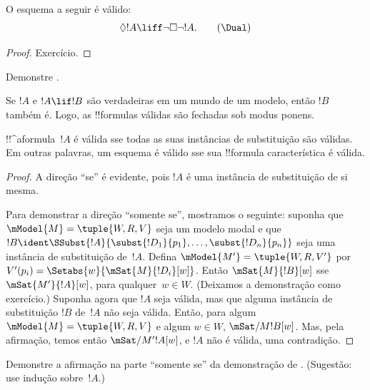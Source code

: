 \documentclass[../../../include/open-logic-section]{subfiles}
\begin{document}
\begin{prop}
  O esquema \Dual{} a seguir é válido:
  \begin{equation*}
  \Diamond !A \liff \lnot\Box\lnot !A. \tag{\Dual}
  \end{equation*}
\end{prop}

\begin{proof}
  Exercício.
\end{proof}

\begin{prob}
  Demonstre .
\end{prob}

\begin{prop}
  Se $!A$ e $!A \lif !B$ são verdadeiras em um mundo de um modelo,
  então $!B$ também é. Logo, as !!{formula}s válidas são fechadas sob
  modus ponens.
\end{prop}

\begin{prop}
  !!^a{formula}~$!A$ é válida sse todas as suas instâncias de substituição
  são válidas. Em outras palavras, um esquema é válido sse sua
  !!{formula} característica é válida.
\end{prop}

\begin{proof}
  A direção ``se'' é evidente, pois $!A$ é uma instância de substituição
  de si mesma.

  Para demonstrar a direção ``somente se'', mostramos o seguinte:
  suponha que $\mModel{M} = \tuple{W, R, V}$ seja um modelo modal e que
  $!B \ident \SSubst{!A}{\subst{!D_1}{p_1},\dots,\subst{!D_n}{p_n}}$
  seja uma instância de substituição de~$!A$. Defina $\mModel{M'} =
  \tuple{W, R, V'}$ por $V'(p_i) = \Setabs{w}{\mSat{M}{!D_i}[w]}$.
  Então $\mSat{M}{!B}[w]$ sse $\mSat{M'}{!A}[w]$, para qualquer~$w \in W$.
  (Deixamos a demonstração como exercício.) Suponha agora que $!A$ seja
  válida, mas que alguma instância de substituição $!B$ de~$!A$ não seja
  válida. Então, para algum $\mModel{M} = \tuple{W, R, V}$ e algum
  $w \in W$, $\mSat/{M}{!B}[w]$. Mas, pela afirmação, temos então
  $\mSat/{M'}{!A}[w]$, e $!A$ não é válida, uma contradição.
\end{proof}

\begin{prob}
  Demonstre a afirmação na parte ``somente se'' da demonstração de
  . (Sugestão: use indução
  sobre~$!A$.)
\end{prob}
\end{document}

